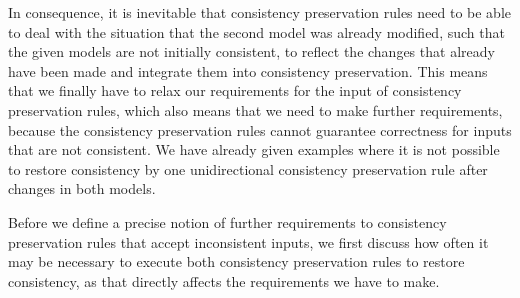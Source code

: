 In consequence, it is inevitable that consistency preservation rules need to be able to deal with the situation that the second model was already modified, such that the given models are not initially consistent, to reflect the changes that already have been made and integrate them into consistency preservation.
This means that we finally have to relax our requirements for the input of consistency preservation rules, which also means that we need to make further requirements, because the consistency preservation rules cannot guarantee correctness for inputs that are not consistent.
We have already given examples where it is not possible to restore consistency by one unidirectional consistency preservation rule after changes in both models.

Before we define a precise notion of further requirements to consistency preservation rules that accept inconsistent inputs, we first discuss how often it may be necessary to execute both consistency preservation rules to restore consistency, as that directly affects the requirements we have to make.



